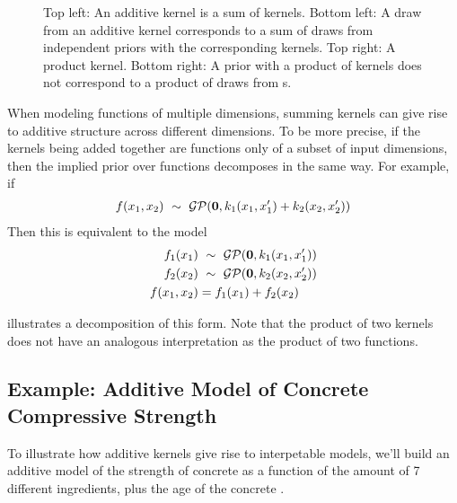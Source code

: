 \begin{figure}[ht!]
\begin{tabular}{ccccc|c}
\end{tabular}
\caption[Additive kernels correspond to additive functions]{
Top left: An additive kernel is a sum of kernels.
Bottom left:  A draw from an additive kernel corresponds to a sum of draws from independent \gp{} priors with the corresponding kernels.
Top right: A product kernel.
Bottom right:  A \gp{} prior with a product of kernels does not correspond to a product of draws from \gp{}s.
}
\label{fig:kernels}
\end{figure}

When modeling functions of multiple dimensions, summing kernels can give rise to additive structure across different dimensions.
To be more precise, if the kernels being added together are functions only of a subset of input dimensions, then the implied prior over functions decomposes in the same way.
For example, if
%
\begin{align}
f(x_1, x_2) \ \sim\  \mathcal{GP}({\bf{0}}, k_1(x_1, x_1') + k_2(x_2, x_2'))
\end{align}
%
Then this is equivalent to the model
%
\begin{align}
f_1(x_1) & \ \sim\  \mathcal{GP}({\bf{0}}, k_1(x_1, x_1'))\\
f_2(x_2) & \ \sim\  \mathcal{GP}({\bf{0}}, k_2(x_2, x_2'))\\
f(x_1, x_2) & = f_1(x_1) + f_2(x_2)
\end{align}
%
%

 illustrates a decomposition of this form.
Note that the product of two kernels does not have an analogous interpretation as the product of two functions.



\subsection{Example: Additive Model of Concrete Compressive Strength}
\label{sec:concrete}

To illustrate how additive kernels give rise to interpetable models, we'll build an additive model of the strength of concrete as a function of the amount of 7 different ingredients, plus the age of the concrete \citep{yeh1998modeling}.


